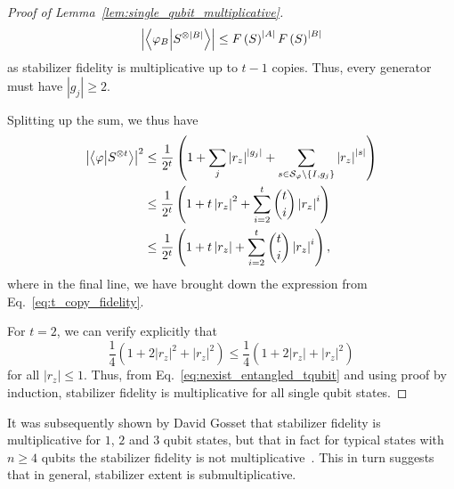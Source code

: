 \begin{proof}[Proof of Lemma~\ref{lem:single_qubit_multiplicative}]
\[\left|\braket{\varphi_{B}}{S^{\otimes \left|B\right|}}\right| \leq F\left(S\right)^{\left|A\right|}F\left(S\right)^{\left|B\right|}\]
as stabilizer fidelity is multiplicative up to $t-1$ copies. Thus, every generator must have $\left|g_{j}\right| \geq 2$.\par
Splitting up the sum, we thus have
\begin{align}
\left|\braket{\varphi}{S^{\otimes t}}\right|^{2} &\leq \frac{1}{2^{t}} \left(1 + \sum_{j}\left|r_{z}\right|^{\left|g_{j}\right|} + \sum_{s \in \mathcal{S}_{\varphi}\setminus \{I, g_{j}\}}\left|r_{z}\right|^{\left|s\right|}\right) \nonumber \\
& \leq \frac{1}{2^{t}}\left(1+t\left|r_{z}\right|^{2} + \sum_{i=2}^{t}\binom{t}{i}\left|r_{z}\right|^{i}\right) \nonumber \\
&\leq \frac{1}{2^{t}} \left( 1+t\left|r_{z}\right| + \sum_{i=2}^{t}\binom{t}{i}\left|r_{z}\right|^{i} \right),
\label{eq:nexist_entangled_tqubit}
\end{align}
where in the final line, we have brought down the expression from Eq.~\ref{eq:t_copy_fidelity}.\par
For $t=2$, we can verify explicitly that 
\[\frac{1}{4}\left(1+2\left|r_{z}\right|^{2} + \left|r_{z}\right|^{2}\right) \leq \frac{1}{4}\left(1+2\left|r_{z}\right|+ \left|r_{z}\right|^{2}\right)\]
for all $\left|r_{z}\right|\leq 1$. Thus, from Eq.~\ref{eq:nexist_entangled_tqubit} and using proof by induction, stabilizer fidelity is multiplicative for all single qubit states.
\end{proof}
It was subsequently shown by David Gosset that stabilizer fidelity is multiplicative for $1$, $2$ and $3$ qubit states, but that in fact for typical states with $n\geq 4$ qubits the stabilizer fidelity is not multiplicative~\cite{Bravyi2018}. This in turn suggests that in general, stabilizer extent is submultiplicative.
